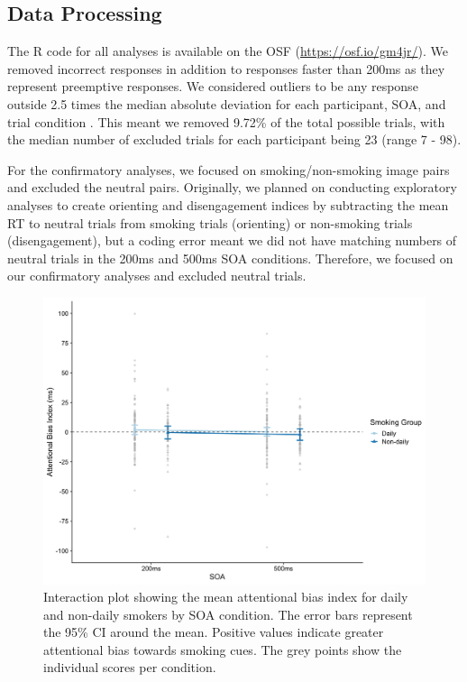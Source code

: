 \documentclass[empirical, authordate]{jote-new-article}
\begin{document}
\subsection{Data Processing}

The R code for all analyses is available on the OSF (\url{https://osf.io/gm4jr/}). We removed incorrect responses in addition to responses faster than 200ms as they represent preemptive responses. We considered outliers to be any response outside 2.5 times the median absolute deviation for each participant, SOA, and trial condition \parencite{Leys2013}. This meant we removed 9.72\% of the total possible trials, with the median number of excluded trials for each participant being 23 (range 7 - 98).

For the confirmatory analyses, we focused on smoking/non-smoking image pairs and excluded the neutral pairs. Originally, we planned on conducting exploratory analyses to create orienting and disengagement indices \parencite{Salemink2007} by subtracting the mean RT to neutral trials from smoking trials (orienting) or non-smoking trials (disengagement), but a coding error meant we did not have matching numbers of neutral trials in the 200ms and 500ms SOA conditions. Therefore, we focused on our confirmatory analyses and excluded neutral trials.

\begin{figure}[t]

  \begin{fullwidth}
    \includegraphics[width=\linewidth]{media/image3.jpeg}
    \caption{Interaction plot showing the mean attentional bias index for daily and non-daily smokers by SOA condition. The error bars represent the 95\% CI around the mean. Positive values indicate greater attentional bias towards smoking cues. The grey points show the individual scores per condition.}
    \label{fig:3}

  \end{fullwidth}


\end{figure}
\end{document}
